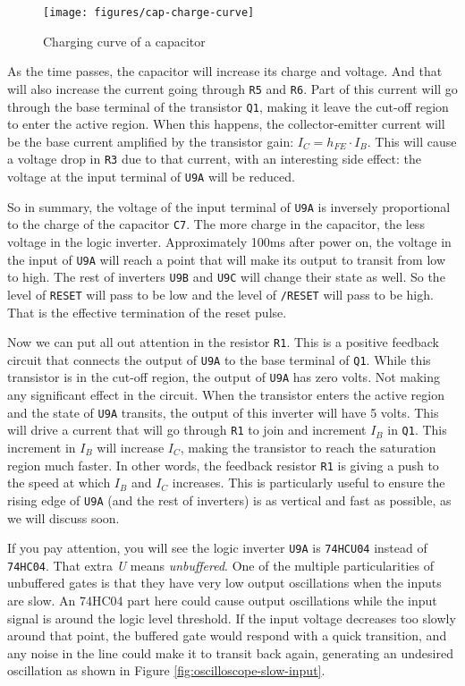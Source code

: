 \begin{figure}[h]
  \centering
  \texttt{[image: figures/cap-charge-curve]}
  \caption{Charging curve of a capacitor}
  \label{fig:cap-curves}
\end{figure}

As the time passes, the capacitor will increase its charge and voltage. And that will also increase the current going through {\tt R5} and {\tt R6}. Part of this current will go through the base terminal of the transistor {\tt Q1}, making it leave the cut-off region to enter the active region. When this happens, the collector-emitter current will be the base current amplified by the transistor gain: $I_C = h_{FE} \cdot I_B$. This will cause a voltage drop in {\tt R3} due to that current, with an interesting side effect: the voltage at the input terminal of {\tt U9A} will be reduced.

So in summary, the voltage of the input terminal of {\tt U9A} is inversely proportional to the charge of the capacitor {\tt C7}. The more charge in the capacitor, the less voltage in the logic inverter. Approximately 100ms after power on, the voltage in the input of {\tt U9A} will reach a point that will make its output to transit from low to high. The rest of inverters {\tt U9B} and {\tt U9C} will change their state as well. So the level of {\tt RESET} will pass to be low and the level of {\tt /RESET} will pass to be high. That is the effective termination of the reset pulse.

Now we can put all out attention in the resistor {\tt R1}. This is a positive feedback circuit that connects the output of {\tt U9A} to the base terminal of {\tt Q1}. While this transistor is in the cut-off region, the output of {\tt U9A} has zero volts. Not making any significant effect in the circuit. When the transistor enters the active region and the state of {\tt U9A} transits, the output of this inverter will have 5 volts. This will drive a current that will go through {\tt R1} to join and increment $I_B$ in {\tt Q1}. This increment in $I_B$ will increase $I_C$, making the transistor to reach the saturation region much faster. In other words, the feedback resistor {\tt R1} is giving a push to the speed at which $I_B$ and $I_C$ increases. This is particularly useful to ensure the rising edge of {\tt U9A} (and the rest of inverters) is as vertical and fast as possible, as we will discuss soon.

If you pay attention, you will see the logic inverter {\tt U9A} is {\tt 74HCU04} instead of {\tt 74HC04}. That extra {\it U} means {\it unbuffered}. One of the multiple particularities of unbuffered gates is that they have very low output oscillations when the inputs are slow. An 74HC04 part here could cause output oscillations while the input signal is around the logic level threshold. If the input voltage decreases too slowly around that point, the buffered gate would respond with a quick transition, and any noise in the line could make it to transit back again, generating an undesired oscillation as shown in Figure \ref{fig:oscilloscope-slow-input}.


